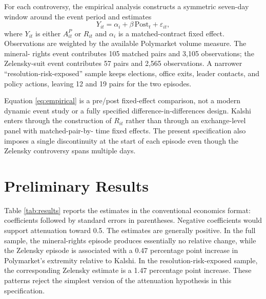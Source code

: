 \documentclass[11pt]{article}
\begin{document}
For each controversy, the empirical analysis constructs a symmetric seven-day window around the
event period and estimates
\begin{equation}
Y_{it}=\alpha_i+\beta\,\mathrm{Post}_{t}+\varepsilon_{it},
\label{eq:empirical}
\end{equation}
where $Y_{it}$ is either $A^{P}_{it}$ or $R_{it}$ and $\alpha_i$ is a matched-contract fixed
effect. Observations are weighted by the available Polymarket volume measure. The mineral-
rights event contributes 105 matched pairs and 3,105 observations; the Zelensky-suit event
contributes 57 pairs and 2,565 observations. A narrower ``resolution-risk-exposed'' sample
keeps elections, office exits, leader contacts, and policy actions, leaving 12 and 19 pairs
for the two episodes.

Equation \eqref{eq:empirical} is a pre/post fixed-effect comparison, not a modern dynamic
event study or a fully specified difference-in-differences design. Kalshi enters through the
construction of $R_{it}$ rather than through an exchange-level panel with matched-pair-by-
time fixed effects. The present specification also imposes a single discontinuity at the
start of each episode even though the Zelensky controversy spans multiple days.

\section{Preliminary Results}

Table \ref{tab:results} reports the estimates in the conventional economics format:
coefficients followed by standard errors in parentheses. Negative coefficients would support
attenuation toward 0.5. The estimates are generally positive. In the full sample, the
mineral-rights episode produces essentially no relative change, while the Zelensky episode
is associated with a 0.47 percentage point increase in Polymarket's extremity relative to
Kalshi. In the resolution-risk-exposed sample, the corresponding Zelensky estimate is a
1.47 percentage point increase. These patterns reject the simplest version of the
attenuation hypothesis in this specification.
\end{document}
